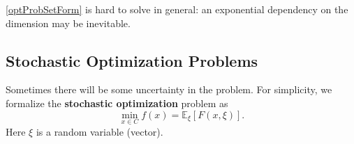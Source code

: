 \documentclass[openany]{book}
\newtheorem{theorem}{Theorem}[chapter]
\theoremstyle{definition}
\theoremstyle{remark}
\begin{document}
\eqref{optProbSetForm} is hard to solve in general: an exponential dependency on the dimension may be inevitable.
\begin{comment}
For instance, consider the following problem:
\begin{equation}\label{unitBoxMin}
    \min_{x\in[0,1]^n}f(x),
\end{equation}
where $f$ is $\lambda$-Lipschitz continuous over $[0,1]^n$. We want to find an $\epsilon$-additive approximate solution.

One can use the uniform grid method: Divide each dimension into $\lceil\frac{\lambda\sqrt{n}}{2\epsilon}\rceil$ uniform intervals, and consider all grid points. We can get an $\epsilon$-approximate solution with a query complexity of $(\lceil\frac{\lambda\sqrt{n}}{2\epsilon}\rceil+1)^n$. What's more, such a query complexity is necessary.

\begin{theorem}
    The query complexity of problem \eqref{unitBoxMin} with a zeroth order oracle is at least $(\lceil \frac{\lambda}{2\epsilon}\rceil-1)^n$.
\end{theorem}
\begin{proof}
    Divide each dimension into $\lceil \frac{\lambda}{2\epsilon}\rceil-1$ uniform intervals. For each query $x$, return $f(x)=0$. Then the algorithm will conclude the minimum is $0$. However, if the query complexity is less than $(\lceil \frac{\lambda}{2\epsilon}\rceil-1)^n$, then there will be one cube $\prod_{i=1}^n[a_i,b_i]$ whose vertices are grid points and no interior point of this cube is queried. We can then set $f(x)=\min_{1\le i\le n}\min\{\lambda(x_i-a_i),\lambda(b_i-x_i)\}$ on $\prod_{i=1}^n[a_i,b_i]$ and $0$ everywhere else. One can check that $f$ is $\lambda$-Lipschitz continuous over $[0,1]^n$ but the optimum value is $(\frac{\lambda}{2})/(\lceil \frac{\lambda}{2\epsilon}\rceil-1)>\epsilon$.
\end{proof}

In economics, and specifically monotone comparative statics, the following parameterized optimization problem is often considered:
\begin{equation}
    \min_{x\in C_t}f(x).
\end{equation}
Here $t\in T$ is a parameter. Monotone comparative statics are interested especially in cases when the optimal solution is a monotone function of $t$.
\end{comment}

\subsection{Stochastic Optimization Problems}
Sometimes there will be some uncertainty in the problem. For simplicity, we formalize the \textbf{stochastic optimization} problem as
\begin{equation}\label{stochOptProb}
    \min_{x\in C}f(x)=\mathbb{E}_{\xi}[F(x,\xi)].
\end{equation}
Here $\xi$ is a random variable (vector).
\end{document}
